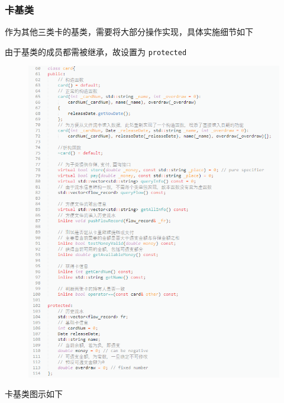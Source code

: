 \documentclass[11pt,UTF8]{ctexart}
\begin{document}
\subsubsection{卡基类}
\par 作为其他三类卡的基类，需要将大部分操作实现，具体实施细节如下
\par 由于基类的成员都需被继承，故设置为 \verb'protected'
\begin{figure}[H]
\centering
\includegraphics[width=\linewidth]{pic/card.PNG}
\end{figure}
\par 卡基类图示如下
\end{document}
